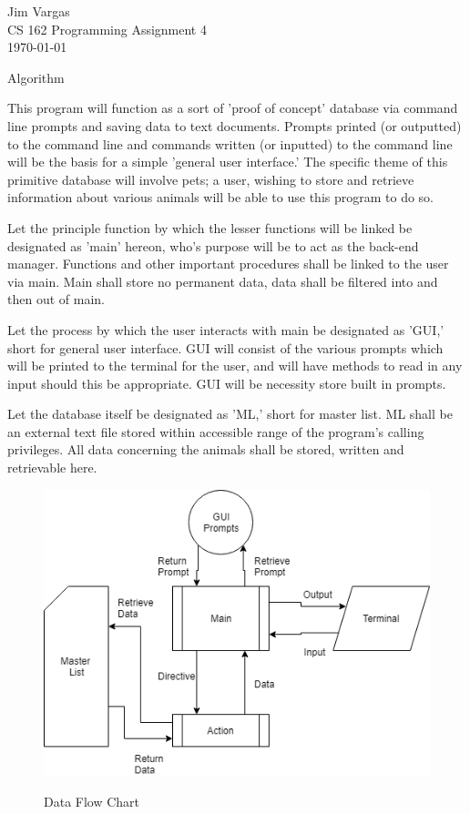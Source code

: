 \documentclass[12]{article}
\begin{document}
\noindent
\onehalfspacing
Jim Vargas \\
CS 162 Programming Assignment 4 \\
\today \\
\begin{center}
Algorithm
\end{center}

	This program will function as a sort of 'proof of concept' database via command line prompts and saving data to text documents. Prompts printed (or outputted) to the command line and commands written (or inputted) to the command line will be the basis for a simple 'general user interface.' The specific theme of this primitive database will involve pets; a user, wishing to store and retrieve information about various animals will be able to use this program to do so.
	
	Let the principle function by which the lesser functions will be linked be designated as 'main' hereon, who's purpose will be to act as the back-end manager. Functions and other important procedures shall be linked to the user via main. Main shall store no permanent data, data shall be filtered into and then out of main.
		
	Let the process by which the user interacts with main be designated as 'GUI,' short for general user interface. GUI will consist of the various prompts which will be printed to the terminal for the user, and will have methods to read in any input should this be appropriate. GUI will be necessity store built in prompts.
	
	Let the database itself be designated as 'ML,' short for master list. ML shall be an external text file stored within accessible range of the program's calling privileges. All data concerning the animals shall be stored, written and retrievable here.
	
\begin{figure}[h]
\centering
\includegraphics[scale=.8]{data_chart.png}\\
\caption{Data Flow Chart} 
\label{fig:fig1}
\end{figure}
\end{document}
